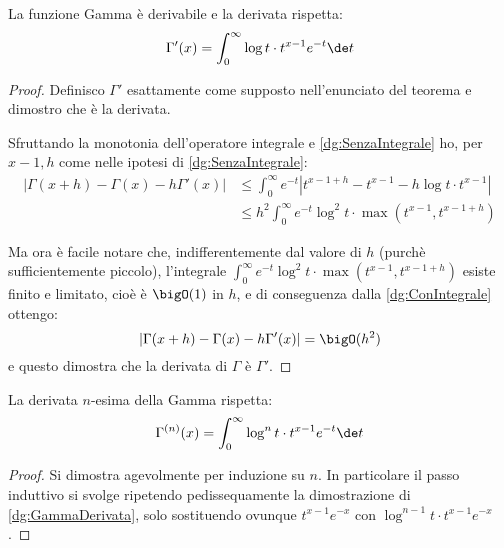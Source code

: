 \begin{theorem}\label{dg:GammaDerivata}
	La funzione Gamma è derivabile e la derivata rispetta:
	\begin{equation*}
		\Gamma'(x)=\int_0^{\infty} \log{t}\cdot t^{x-1}e^{-t}\de t
	\end{equation*}
\end{theorem}
\begin{proof}
	Definisco $\Gamma'$ esattamente come supposto nell'enunciato del teorema e dimostro che è la derivata.

	Sfruttando la monotonia dell'operatore integrale e \cref{dg:SenzaIntegrale} ho, per $x-1,h$ come nelle ipotesi di \cref{dg:SenzaIntegrale}:
	\begin{equation}\label{dg:ConIntegrale} \begin{split}
		|\Gamma(x+h)-\Gamma(x)-h\Gamma'(x)|&\le \int_0^{\infty}e^{-t}|t^{x-1+h}-t^{x-1}-h\log t\cdot t^{x-1}| \\
		&\le h^2\int_0^{\infty} e^{-t}\log^2 t\cdot \max\left(t^{x-1},t^{x-1+h}\right)
	\end{split}\end{equation}

	Ma ora è facile notare che, indifferentemente dal valore di $h$ (purchè sufficientemente piccolo), l'integrale $\int_0^{\infty} e^{-t}\log^2 t\cdot \max\left(t^{x-1},t^{x-1+h}\right)$ esiste finito e limitato, cioè è $\bigO(1)$ in $h$, e di conseguenza dalla \cref{dg:ConIntegrale} ottengo:
	\begin{equation*}
		|\Gamma(x+h)-\Gamma(x)-h\Gamma'(x)|=\bigO(h^2)
	\end{equation*}
	e questo dimostra che la derivata di $\Gamma$ è $\Gamma'$.
\end{proof}
\begin{corollary}\label{dg:GammaDerivataN}
	La derivata $n$-esima della Gamma rispetta:
	\begin{equation*}
		\Gamma^{(n)}(x)=\int_0^{\infty} \log^{n}{t}\cdot t^{x-1}e^{-t}\de t
	\end{equation*}
\end{corollary}
\begin{proof}
	Si dimostra agevolmente per induzione su $n$. In particolare il passo induttivo si svolge
	ripetendo pedissequamente la dimostrazione di \cref{dg:GammaDerivata}, solo sostituendo ovunque $t^{x-1}e^{-x}$
	con $\log^{n-1}{t}\cdot t^{x-1}e^{-x}$.
\end{proof}
